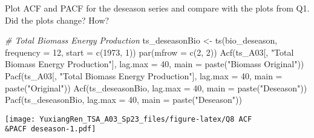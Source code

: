 \documentclass[
]{article}
\newenvironment{Shaded}{\begin{snugshade}}{\end{snugshade}}
\newcommand{\AttributeTok}[1]{\textcolor[rgb]{0.77,0.63,0.00}{#1}}
\newcommand{\CommentTok}[1]{\textcolor[rgb]{0.56,0.35,0.01}{\textit{#1}}}
\newcommand{\DecValTok}[1]{\textcolor[rgb]{0.00,0.00,0.81}{#1}}
\newcommand{\FunctionTok}[1]{\textcolor[rgb]{0.00,0.00,0.00}{#1}}
\newcommand{\NormalTok}[1]{#1}
\newcommand{\OtherTok}[1]{\textcolor[rgb]{0.56,0.35,0.01}{#1}}
\newcommand{\StringTok}[1]{\textcolor[rgb]{0.31,0.60,0.02}{#1}}
\begin{document}
Plot ACF and PACF for the deseason series and compare with the plots
from Q1. Did the plots change? How?

\begin{Shaded}
\begin{Highlighting}[]
\CommentTok{\# Total Biomass Energy Production}
\NormalTok{ts\_deseasonBio }\OtherTok{\textless{}{-}} \FunctionTok{ts}\NormalTok{(bio\_deseason, }\AttributeTok{frequency =} \DecValTok{12}\NormalTok{, }\AttributeTok{start =} \FunctionTok{c}\NormalTok{(}\DecValTok{1973}\NormalTok{, }\DecValTok{1}\NormalTok{))}
\FunctionTok{par}\NormalTok{(}\AttributeTok{mfrow =} \FunctionTok{c}\NormalTok{(}\DecValTok{2}\NormalTok{, }\DecValTok{2}\NormalTok{))}
\FunctionTok{Acf}\NormalTok{(ts\_A03[, }\StringTok{"Total Biomass Energy Production"}\NormalTok{], }\AttributeTok{lag.max =} \DecValTok{40}\NormalTok{, }\AttributeTok{main =} \FunctionTok{paste}\NormalTok{(}\StringTok{"Biomass Original"}\NormalTok{))}
\FunctionTok{Pacf}\NormalTok{(ts\_A03[, }\StringTok{"Total Biomass Energy Production"}\NormalTok{], }\AttributeTok{lag.max =} \DecValTok{40}\NormalTok{, }\AttributeTok{main =} \FunctionTok{paste}\NormalTok{(}\StringTok{"Original"}\NormalTok{))}
\FunctionTok{Acf}\NormalTok{(ts\_deseasonBio, }\AttributeTok{lag.max =} \DecValTok{40}\NormalTok{, }\AttributeTok{main =} \FunctionTok{paste}\NormalTok{(}\StringTok{"Deseason"}\NormalTok{))}
\FunctionTok{Pacf}\NormalTok{(ts\_deseasonBio, }\AttributeTok{lag.max =} \DecValTok{40}\NormalTok{, }\AttributeTok{main =} \FunctionTok{paste}\NormalTok{(}\StringTok{"Deseason"}\NormalTok{))}
\end{Highlighting}
\end{Shaded}

\texttt{[image: YuxiangRen\_TSA\_A03\_Sp23\_files/figure-latex/Q8 ACF\\\&PACF deseason-1.pdf]}
\end{document}
